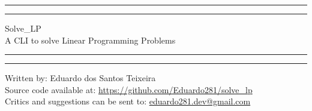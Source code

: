 \documentclass[12pt,hidelinks]{article}
\begin{document}
\begin{titlepage}
	\centering %
	\scshape %
	\vspace*{1.5\baselineskip} %

	\rule{13cm}{1.6pt}\vspace*{-\baselineskip}\vspace*{2pt} %
	\rule{13cm}{0.4pt} %
	
		\vspace{0.75\baselineskip} %
	{	\Huge Solve\_LP\\ 
			\vspace{4mm}
		\LARGE	A CLI to solve Linear Programming Problems \\	}
		\vspace{0.75\baselineskip} %
	\rule{13cm}{0.4pt}\vspace*{-\baselineskip}\vspace{3.2pt} %
	\rule{13cm}{1.6pt} %
	
		\vspace{1.75\baselineskip} %
	\vfill
Written by: Eduardo dos Santos Teixeira\\
Source code available at: \url{https://github.com/Eduardo281/solve_lp}\\
Critics and suggestions can be sent to: \url{eduardo281.dev@gmail.com}
\end{titlepage}
\tableofcontents
\newpage
{}
\end{document}
